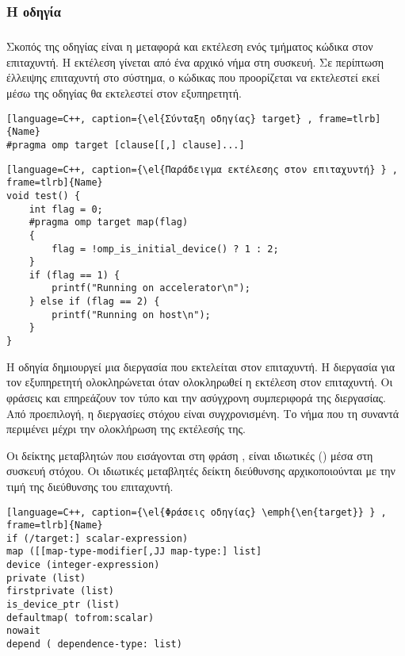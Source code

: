 \subsubsection{Η οδηγία }
\subparagraph{}
Σκοπός της οδηγίας  είναι η μεταφορά και εκτέλεση ενός τμήματος κώδικα στον επιταχυντή. Η εκτέλεση γίνεται από ένα αρχικό νήμα στη συσκευή. Σε περίπτωση έλλειψης επιταχυντή στο σύστημα, ο κώδικας που προορίζεται να εκτελεστεί εκεί μέσω της οδηγίας \emph{} θα εκτελεστεί στον εξυπηρετητή.

\begin{lstlisting}[language=C++, caption={\el{Σύνταξη οδηγίας} target} , frame=tlrb]{Name}
#pragma omp target [clause[[,] clause]...]
\end{lstlisting}

\begin{lstlisting}[language=C++, caption={\el{Παράδειγμα εκτέλεσης στον επιταχυντή} } , frame=tlrb]{Name}
void test() {
	int flag = 0;
	#pragma omp target map(flag)
	{
		flag = !omp_is_initial_device() ? 1 : 2;
	}
	if (flag == 1) {
		printf("Running on accelerator\n");
	} else if (flag == 2) {
		printf("Running on host\n");
	}
}
\end{lstlisting}

Η οδηγία \emph{} δημιουργεί μια διεργασία που εκτελείται στον επιταχυντή. Η διεργασία για τον εξυπηρετητή ολοκληρώνεται όταν ολοκληρωθεί η εκτέλεση στον επιταχυντή. Οι φράσεις \emph{} και \emph{} επηρεάζουν τον τύπο και την ασύγχρονη συμπεριφορά της διεργασίας. Από προεπιλογή, η διεργασίες στόχου είναι συγχρονισμένη. Το νήμα που τη συναντά περιμένει μέχρι την ολοκλήρωση της εκτέλεσής της.

Οι δείκτης μεταβλητών που εισάγονται στη φράση \emph{}, είναι ιδιωτικές (\emph{}) μέσα στη συσκευή στόχου. Οι ιδιωτικές μεταβλητές δείκτη διεύθυνσης αρχικοποιούνται με την τιμή της διεύθυνσης του επιταχυντή.

\clearpage

\begin{lstlisting}[language=C++, caption={\el{Φράσεις οδηγίας} \emph{\en{target}} } , frame=tlrb]{Name}
if (/target:] scalar-expression)
map ([[map-type-modifier[,JJ map-type:] list]
device (integer-expression)
private (list)
firstprivate (list)
is_device_ptr (list)
defaultmap( tofrom:scalar)
nowait
depend ( dependence-type: list)
\end{lstlisting}

